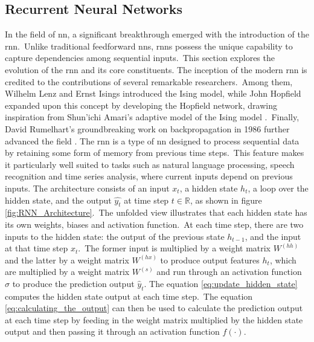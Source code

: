 \subsection{Recurrent Neural Networks}
\label{sub:RNN}

In the field of \gls{nn}, a significant breakthrough emerged with the introduction of the \gls{rnn}.\
Unlike traditional feedforward \glspl{nn}, \glspl{rnn} possess the unique capability to capture dependencies among sequential inputs.\
This section explores the evolution of the \gls{rnn} and its core constituents.
\newline
\newline
The inception of the modern \gls{rnn} is credited to the contributions of several remarkable researchers.\
Among them, Wilhelm Lenz and Ernst Isings introduced the Ising model, while John Hopfield expanded upon this concept by developing the Hopfield network, drawing inspiration from Shun'ichi Amari's adaptive model of the Ising model \citep{hopfield1982neural}.\
Finally, David Rumelhart's groundbreaking work on backpropagation in 1986 further advanced the field \citep{rumelhart1986learning}.
\newline
\newline
The \gls{rnn} is a type of \gls{nn} designed to process sequential data by retaining some form of memory from previous time steps.\
This feature makes it particularly well suited to tasks such as natural language processing, speech recognition and time series analysis, where current inputs depend on previous inputs.
\newline
\newline
The architecture consists of an input $x_t$, a hidden state $h_t$, a loop over the hidden state, and the output $\hat{y_t}$ at time step $t \in \mathbb{R}$, as shown in figure \ref{fig:RNN_Architecture}.\
The unfolded view illustrates that each hidden state has its own weights, biases and activation function.\
At each time step, there are two inputs to the hidden state: the output of the previous state $h_{t-1}$, and the input at that time step $x_t$.\
The former input is multiplied by a weight matrix $W^{(hh)}$ and the latter by a weight matrix $W^{(hx)}$ to produce output features $h_t$, which are multiplied by a weight matrix $W^{(s)}$ and run through an activation function $\sigma$ to produce the prediction output $\hat{y}_t$.
\newline
\newline
The equation \ref{eq:update_hidden_state} computes the hidden state output at each time step.\
The equation \ref{eq:calculating_the_output} can then be used to calculate the prediction output at each time step by feeding in the weight matrix multiplied by the hidden state output and then passing it through an activation function $f(\cdot)$.

